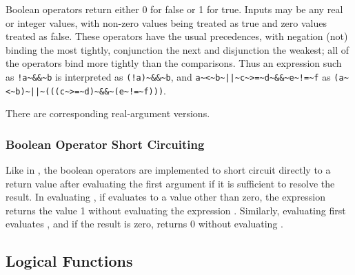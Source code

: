 Boolean operators return either 0 for false or 1 for true.  Inputs may
be any real or integer values, with non-zero values being treated as
true and zero values treated as false.  These operators have the usual
precedences, with negation (not) binding the most tightly, conjunction
the next and disjunction the weakest; all of the operators bind more
tightly than the comparisons.  Thus an expression such as
\Verb|!a~&&~b| is interpreted as \Verb|(!a)~&&~b|, and
\Verb/a~<~b~||~c~>=~d~&&~e~!=~f/ as
\Verb/(a~<~b)~||~(((c~>=~d)~&&~(e~!=~f)))/.
%
\begin{description}
\end{description}
%
There are corresponding real-argument versions.
%
\begin{description}
\end{description}


\subsubsection{Boolean Operator Short Circuiting}

Like in \Cpp, the boolean operators are implemented to short circuit
directly to a return value after evaluating the first argument if it
is sufficient to resolve the result.  In evaluating , if
 evaluates to a value other than zero, the expression returns
the value 1 without evaluating the expression .  Similarly,
evaluating  first evaluates , and if the result
is zero, returns 0 without evaluating .





\subsection{Logical Functions}

